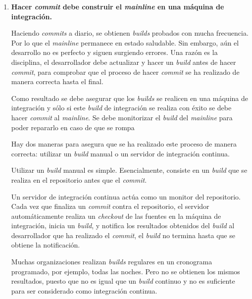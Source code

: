 \begin{enumerate}
\item \textbf{Hacer \textit{commit} debe construir el \textit{mainline} en una máquina de integración.}

Haciendo \textit{commits} a diario, se obtienen \textit{builds} probados con mucha frecuencia. Por lo que el \textit{mainline} permanece en estado saludable. Sin embargo, aún el desarrollo no es perfecto y siguen surgiendo errores. Una razón es la disciplina, el desarrollador debe actualizar y hacer un \textit{build} antes de hacer \textit{commit}, para comprobar que el proceso de hacer \textit{commit} se ha realizado de manera correcta hasta el final.

Como resultado se debe asegurar que los \textit{builds} se realicen en una máquina de integración y sólo si este \textit{build} de integración se realiza con éxito se debe hacer \textit{commit} al \textit{mainline}. Se debe monitorizar el \textit{build} del \textit{mainline} para poder repararlo en caso de que se rompa


Hay dos maneras para asegura que se ha realizado este proceso de manera correcta: utilizar un \textit{build} manual o un servidor de integración continua.

Utilizar un \textit{build} manual es simple. Esencialmente, consiste en un \textit{build} que se realiza en el repositorio antes que el \textit{commit}.%

Un servidor de integración continua actúa como un monitor del repositorio. Cada vez que finaliza un \textit{commit} contra el repositorio, el servidor automáticamente realiza un \textit{checkout} de las fuentes en la máquina de integración, inicia un \textit{build}, y notifica los resultados obtenidos del \textit{build} al desarrollador que ha realizado el \textit{commit}, el \textit{build} no termina hasta que se obtiene la notificación.

Muchas organizaciones realizan \textit{builds} regulares en un cronograma programado, por ejemplo, todas las noches. Pero no se obtienen los mismos resultados, puesto que no es igual que un \textit{build} continuo y no es suficiente para ser considerado como integración continua.


\end{enumerate}
